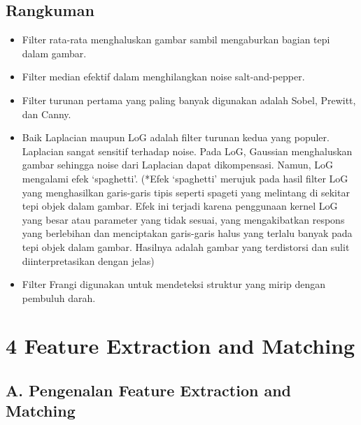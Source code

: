 \documentclass[
  letterpaper,
  DIV=11,
  numbers=noendperiod]{scrreprt}
\providecommand{\tightlist}{%
  \setlength{\itemsep}{0pt}\setlength{\parskip}{0pt}}\usepackage{longtable,booktabs,array}
\begin{document}
\hypertarget{rangkuman}{%
\section*{Rangkuman}\label{rangkuman}}


\begin{itemize}
\tightlist
\item
  Filter rata-rata menghaluskan gambar sambil mengaburkan bagian tepi
  dalam gambar.
\item
  Filter median efektif dalam menghilangkan noise salt-and-pepper.
\item
  Filter turunan pertama yang paling banyak digunakan adalah Sobel,
  Prewitt, dan Canny.
\item
  Baik Laplacian maupun LoG adalah filter turunan kedua yang populer.
  Laplacian sangat sensitif terhadap noise. Pada LoG, Gaussian
  menghaluskan gambar sehingga noise dari Laplacian dapat dikompensasi.
  Namun, LoG mengalami efek `spaghetti'. (*Efek `spaghetti' merujuk pada
  hasil filter LoG yang menghasilkan garis-garis tipis seperti spageti
  yang melintang di sekitar tepi objek dalam gambar. Efek ini terjadi
  karena penggunaan kernel LoG yang besar atau parameter yang tidak
  sesuai, yang mengakibatkan respons yang berlebihan dan menciptakan
  garis-garis halus yang terlalu banyak pada tepi objek dalam gambar.
  Hasilnya adalah gambar yang terdistorsi dan sulit diinterpretasikan
  dengan jelas)
\item
  Filter Frangi digunakan untuk mendeteksi struktur yang mirip dengan
  pembuluh darah.
\end{itemize}

\hypertarget{feature-extraction-and-matching}{%
\chapter*{4 Feature Extraction and
Matching}\label{feature-extraction-and-matching}}


\hypertarget{a.-pengenalan-feature-extraction-and-matching}{%
\section*{A. Pengenalan Feature Extraction and
Matching}\label{a.-pengenalan-feature-extraction-and-matching}}
\end{document}
